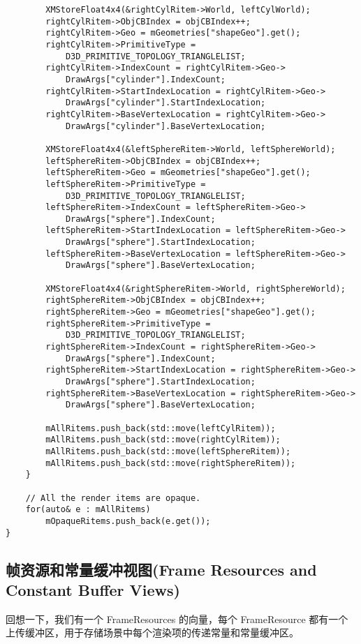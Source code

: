 \begin{lstlisting}
        XMStoreFloat4x4(&rightCylRitem->World, leftCylWorld);
        rightCylRitem->ObjCBIndex = objCBIndex++;
        rightCylRitem->Geo = mGeometries["shapeGeo"].get();
        rightCylRitem->PrimitiveType = 
            D3D_PRIMITIVE_TOPOLOGY_TRIANGLELIST;
        rightCylRitem->IndexCount = rightCylRitem->Geo->
            DrawArgs["cylinder"].IndexCount;
        rightCylRitem->StartIndexLocation = rightCylRitem->Geo->
            DrawArgs["cylinder"].StartIndexLocation;
        rightCylRitem->BaseVertexLocation = rightCylRitem->Geo->
            DrawArgs["cylinder"].BaseVertexLocation;

        XMStoreFloat4x4(&leftSphereRitem->World, leftSphereWorld);
        leftSphereRitem->ObjCBIndex = objCBIndex++;
        leftSphereRitem->Geo = mGeometries["shapeGeo"].get();
        leftSphereRitem->PrimitiveType = 
            D3D_PRIMITIVE_TOPOLOGY_TRIANGLELIST;
        leftSphereRitem->IndexCount = leftSphereRitem->Geo->
            DrawArgs["sphere"].IndexCount;
        leftSphereRitem->StartIndexLocation = leftSphereRitem->Geo->
            DrawArgs["sphere"].StartIndexLocation;
        leftSphereRitem->BaseVertexLocation = leftSphereRitem->Geo->
            DrawArgs["sphere"].BaseVertexLocation;

        XMStoreFloat4x4(&rightSphereRitem->World, rightSphereWorld);
        rightSphereRitem->ObjCBIndex = objCBIndex++;
        rightSphereRitem->Geo = mGeometries["shapeGeo"].get();
        rightSphereRitem->PrimitiveType = 
            D3D_PRIMITIVE_TOPOLOGY_TRIANGLELIST;
        rightSphereRitem->IndexCount = rightSphereRitem->Geo->
            DrawArgs["sphere"].IndexCount;
        rightSphereRitem->StartIndexLocation = rightSphereRitem->Geo->
            DrawArgs["sphere"].StartIndexLocation;
        rightSphereRitem->BaseVertexLocation = rightSphereRitem->Geo->
            DrawArgs["sphere"].BaseVertexLocation;

        mAllRitems.push_back(std::move(leftCylRitem));
        mAllRitems.push_back(std::move(rightCylRitem));
        mAllRitems.push_back(std::move(leftSphereRitem));
        mAllRitems.push_back(std::move(rightSphereRitem));
    }

    // All the render items are opaque.
    for(auto& e : mAllRitems)
        mOpaqueRitems.push_back(e.get());
}
\end{lstlisting}

\subsection{帧资源和常量缓冲视图(Frame Resources and Constant Buffer Views)}
\begin{flushleft}
回想一下，我们有一个 FrameResources 的向量，每个 FrameResource 都有一个上传缓冲区，用于存储场景中每个渲染项的传递常量和常量缓冲区。
\end{flushleft}

